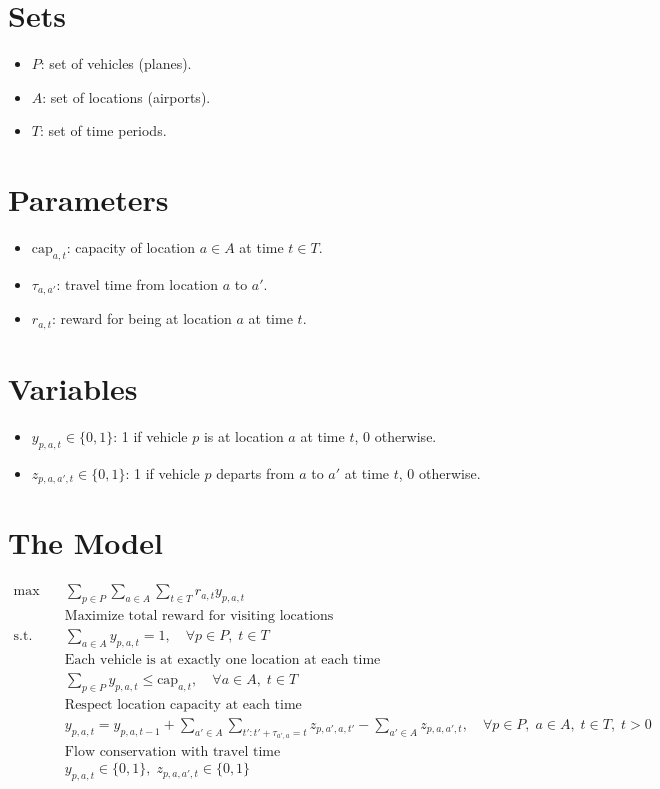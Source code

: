 \documentclass{article}
\begin{document}
\section{Sets}
\begin{itemize}[leftmargin=*,nosep]
    \item $P$: set of vehicles (planes).
    \item $A$: set of locations (airports).
    \item $T$: set of time periods.
\end{itemize}

\section{Parameters}
\begin{itemize}[leftmargin=*,nosep]
    \item $\text{cap}_{a,t}$: capacity of location $a \in A$ at time $t \in T$.
    \item $\tau_{a,a'}$: travel time from location $a$ to $a'$.
    \item $r_{a,t}$: reward for being at location $a$ at time $t$.
\end{itemize}

\section{Variables}
\begin{itemize}[leftmargin=*,nosep]
    \item $y_{p,a,t} \in \{0,1\}$: 1 if vehicle $p$ is at location $a$ at time $t$, 0 otherwise.
    \item $z_{p,a,a',t} \in \{0,1\}$: 1 if vehicle $p$ departs from $a$ to $a'$ at time $t$, 0 otherwise.
\end{itemize}

\section{The Model}
\begin{align*}
    \max \quad & \sum_{p \in P} \sum_{a \in A} \sum_{t \in T} r_{a,t} y_{p,a,t} \\
    & \text{Maximize total reward for visiting locations} \\
\text{s.t.} \quad 
    & \sum_{a \in A} y_{p,a,t} = 1, \quad \forall p \in P,\; t \in T \\
    & \text{Each vehicle is at exactly one location at each time} \\
    & \sum_{p \in P} y_{p,a,t} \leq \text{cap}_{a,t}, \quad \forall a \in A,\; t \in T \\
    & \text{Respect location capacity at each time} \\
    & y_{p,a,t} = y_{p,a,t-1} + \sum_{a' \in A} \sum_{t' : t' + \tau_{a',a} = t} z_{p,a',a,t'} - \sum_{a' \in A} z_{p,a,a',t}, \quad \forall p \in P,\; a \in A,\; t \in T,\; t > 0 \\
    & \text{Flow conservation with travel time} \\
    & y_{p,a,t} \in \{0,1\},\; z_{p,a,a',t} \in \{0,1\}
\end{align*}
\end{document}
